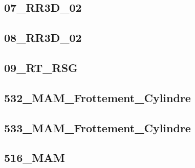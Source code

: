 \subsection{07\_RR3D\_02}
\graphicspath{{../11-Actions Mécaniques/TD/STAT/Demarche/STOCK/07_RR3D_02/images/}{../11-Actions Mécaniques/TD/STAT/Demarche/STOCK/07_RR3D_02/}{../Style/png/}}


\subsection{08\_RR3D\_02}
\graphicspath{{../11-Actions Mécaniques/TD/STAT/Demarche/STOCK/08_RR3D_02/images/}{../11-Actions Mécaniques/TD/STAT/Demarche/STOCK/08_RR3D_02/}{../Style/png/}}


\subsection{09\_RT\_RSG}
\graphicspath{{../11-Actions Mécaniques/TD/STAT/Demarche/STOCK/09_RT_RSG/images/}{../11-Actions Mécaniques/TD/STAT/Demarche/STOCK/09_RT_RSG/}{../Style/png/}}


\subsection{532\_MAM\_Frottement\_Cylindre}
\graphicspath{{../11-Actions Mécaniques/TD/STAT/Frottement/532_MAM_Frottement_Cylindre/images/}{../11-Actions Mécaniques/TD/STAT/Frottement/532_MAM_Frottement_Cylindre/}{../Style/png/}}


\subsection{533\_MAM\_Frottement\_Cylindre}
\graphicspath{{../11-Actions Mécaniques/TD/STAT/Frottement/533_MAM_Frottement_Cylindre/images/}{../11-Actions Mécaniques/TD/STAT/Frottement/533_MAM_Frottement_Cylindre/}{../Style/png/}}


\subsection{516\_MAM}
\graphicspath{{../11-Actions Mécaniques/TD/STAT/Global/516_MAM/images/}{../11-Actions Mécaniques/TD/STAT/Global/516_MAM/}{../Style/png/}}


